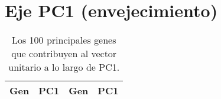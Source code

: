 
\chapter{Eje PC1 (envejecimiento)}\label{apx:apx3}

	
	\begin{longtable}{|c|c||c|c|}
		\caption{Los 100 principales genes que contribuyen al vector unitario a lo largo de PC1.\label{tab:apx3}}\\
		
		\hline
		Gen & PC1 & Gen & PC1 \\ \hline
		\endhead
		

\end{longtable}

